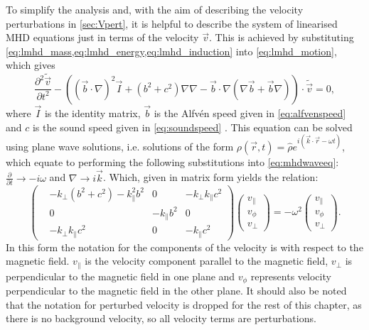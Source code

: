 To simplify the analysis and, with the aim of describing the velocity perturbations in \cref{sec:Vpert}, it is helpful to describe the system of linearised MHD equations just in terms of the velocity $\vec{v}$.
This is achieved by substituting \cref{eq:lmhd_mass,eq:lmhd_energy,eq:lmhd_induction} into \cref{eq:lmhd_motion}, which gives
\begin{equation}
    \frac{\partial^2 \tilde{\vec{v}}}{\partial t^2} - \left( (\vec{b} \cdot \nabla)^2 \vec{I} + (b^2 + c^2) \nabla\nabla - \vec{b} \cdot \nabla (\nabla\vec{b} + \vec{b}\nabla) \right) \cdot \tilde{\vec{v}} = 0,\label{eq:mhdwaveeq}
\end{equation}
where $\vec{I}$ is the identity matrix, $\vec{b}$ is the Alfv\'en speed given in \cref{eq:alfvenspeed} and $c$ is the sound speed given in \cref{eq:soundspeed} \citep{goedbloed2004}.
This equation can be solved using plane wave solutions, i.e. solutions of the form $\rho(\vec{r}, t) = \hat{\rho} e^{i(\vec{k}\cdot\vec{r} - \omega t)}$, which equate to performing the following substitutions into \cref{eq:mhdwaveeq}: $\frac{\partial}{\partial t} \rightarrow - i \omega$ and $\nabla \rightarrow i \vec{k}$.
Which, given in matrix form yields the relation:
\begin{equation}
\begin{pmatrix}
    &-k_\perp(b^2+c^2)-k_\parallel^2 b^2			& 0			& -k_\perp k_\parallel c^2\\
    & 0									&-k_\parallel b^2	& 0\\
    &-k_\perp k_\parallel c^2					& 0			& -k_\parallel c^2
\end{pmatrix}
\begin{pmatrix}
v_\parallel\\
v_\phi\\
v_\perp
\end{pmatrix}
= - \omega^2
\begin{pmatrix}
v_\parallel\\
v_\phi\\
v_\perp
\end{pmatrix}.\label{eq:eigenvalue}
\end{equation}
In this form the notation for the components of the velocity is with respect to the magnetic field. $v_\parallel$ is the velocity component parallel to the magnetic field, $v_\perp$ is perpendicular to the magnetic field in one plane and $v_\phi$ represents velocity perpendicular to the magnetic field in the other plane. It should also be noted that the notation for perturbed velocity is dropped for the rest of this chapter, as there is no background velocity, so all velocity terms are perturbations.

